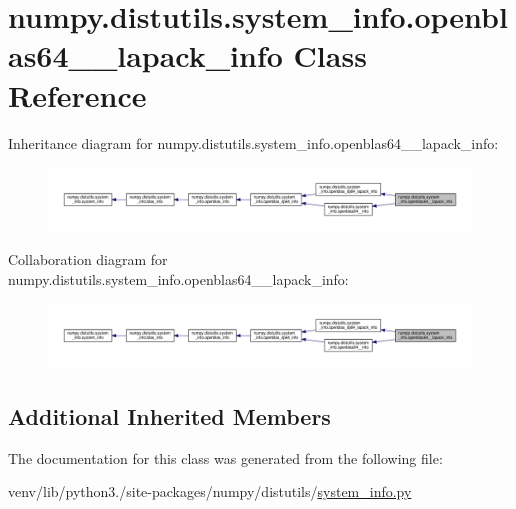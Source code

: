 \hypertarget{classnumpy_1_1distutils_1_1system__info_1_1openblas64____lapack__info}{}\section{numpy.\+distutils.\+system\+\_\+info.\+openblas64\+\_\+\+\_\+lapack\+\_\+info Class Reference}
\label{classnumpy_1_1distutils_1_1system__info_1_1openblas64____lapack__info}


Inheritance diagram for numpy.\+distutils.\+system\+\_\+info.\+openblas64\+\_\+\+\_\+lapack\+\_\+info\+:
\nopagebreak
\begin{figure}[H]
\begin{center}
\leavevmode
\includegraphics[width=350pt]{classnumpy_1_1distutils_1_1system__info_1_1openblas64____lapack__info__inherit__graph}
\end{center}
\end{figure}


Collaboration diagram for numpy.\+distutils.\+system\+\_\+info.\+openblas64\+\_\+\+\_\+lapack\+\_\+info\+:
\nopagebreak
\begin{figure}[H]
\begin{center}
\leavevmode
\includegraphics[width=350pt]{classnumpy_1_1distutils_1_1system__info_1_1openblas64____lapack__info__coll__graph}
\end{center}
\end{figure}
\subsection*{Additional Inherited Members}


The documentation for this class was generated from the following file\+:\begin{DoxyCompactItemize}
\item 
venv/lib/python3./site-\/packages/numpy/distutils/\hyperlink{system__info_8py}{system\+\_\+info.\+py}\end{DoxyCompactItemize}
